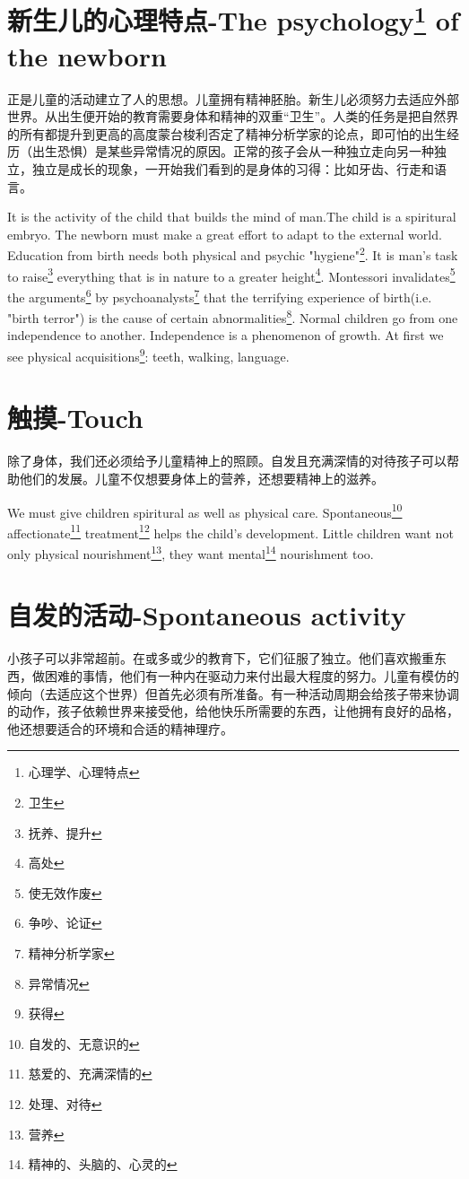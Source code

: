 \documentclass[lang=cn,10pt]{elegantbook}
\begin{document}
\chapter{新生儿的心理特点-The psychology\footnote{心理学、心理特点} of the newborn}

正是儿童的活动建立了人的思想。儿童拥有精神胚胎。新生儿必须努力去适应外部世界。从出生便开始的教育需要身体和精神的双重“卫生”。人类的任务是把自然界的所有都提升到更高的高度蒙台梭利否定了精神分析学家的论点，即可怕的出生经历（出生恐惧）是某些异常情况的原因。正常的孩子会从一种独立走向另一种独立，独立是成长的现象，一开始我们看到的是身体的习得：比如牙齿、行走和语言。

It is the activity of the child that builds the mind of man.The child is a spiritural embryo. The newborn must make a great effort to adapt to the external world. Education from birth needs both physical and psychic "hygiene"\footnote{卫生}. It is man's task to raise\footnote{抚养、提升} everything that is in nature to a greater height\footnote{高处}. Montessori invalidates\footnote{使无效作废} the arguments\footnote{争吵、论证} by psychoanalysts\footnote{精神分析学家} that the terrifying experience of birth(i.e. "birth terror") is the cause of certain abnormalities\footnote{异常情况}. Normal children go from one independence to another. Independence is a phenomenon of growth. At first we see physical acquisitions\footnote{获得}: teeth, walking, language.

\chapter{触摸-Touch}

除了身体，我们还必须给予儿童精神上的照顾。自发且充满深情的对待孩子可以帮助他们的发展。儿童不仅想要身体上的营养，还想要精神上的滋养。

We must give children spiritural as well as physical care. Spontaneous\footnote{自发的、无意识的} affectionate\footnote{慈爱的、充满深情的} treatment\footnote{处理、对待} helps the child's development. Little children want not only physical nourishment\footnote{营养}, they want mental\footnote{精神的、头脑的、心灵的} nourishment too.

\chapter{自发的活动-Spontaneous activity}

小孩子可以非常超前。在或多或少的教育下，它们征服了独立。他们喜欢搬重东西，做困难的事情，他们有一种内在驱动力来付出最大程度的努力。儿童有模仿的倾向（去适应这个世界）但首先必须有所准备。有一种活动周期会给孩子带来协调的动作，孩子依赖世界来接受他，给他快乐所需要的东西，让他拥有良好的品格，他还想要适合的环境和合适的精神理疗。
\end{document}
